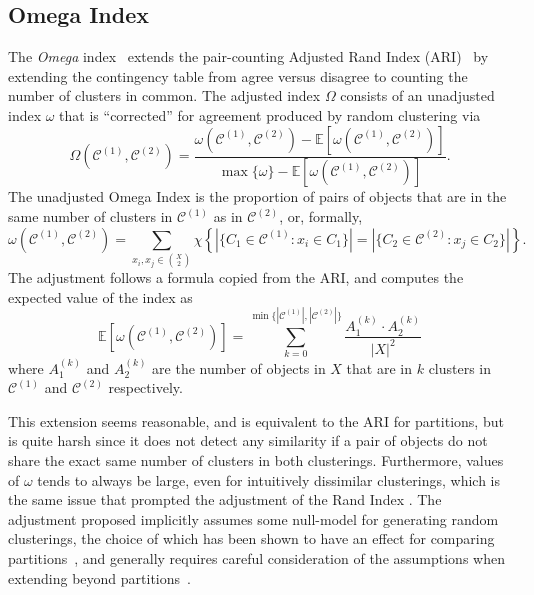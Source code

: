 \documentclass[review,los,12pt]{ryethesis}
\newcommand{\E}{{\mathbb E}}
\newcommand\cCone{\mathcal{C}^{(1)}}
\newcommand\cCtwo{\mathcal{C}^{(2)}}
\begin{document}
\subsection{Omega Index}
The \textit{Omega} index~\cite{omega} extends the pair-counting Adjusted Rand Index (ARI)~\cite{ari} by extending the contingency table from agree versus disagree to counting the number of clusters in common.
The adjusted index $\Omega$ consists of an unadjusted index $\omega$ that is ``corrected'' for agreement produced by random clustering via
\begin{equation*}
    \Omega(\cCone, \cCtwo) = \frac{\omega(\cCone, \cCtwo) - \E[\omega(\cCone, \cCtwo)]}{\max\{\omega\} - \E[\omega(\cCone, \cCtwo)]}.
\end{equation*}
The unadjusted Omega Index is the proportion of pairs of objects that are in the same number of clusters in $\cCone$ as in $\cCtwo$, or, formally,
\begin{equation}
    \omega(\cCone, \cCtwo) = \sum_{x_i, x_j \in {X \choose 2}} \chi\left\{\left|\{C_1 \in \cCone : x_i \in C_1\}\right| = \left|\{C_2 \in \cCtwo : x_j \in C_2\}\right|\right\}.
\end{equation}
The adjustment follows a formula copied from the ARI, and computes the expected value of the index as
\begin{equation}
    \E[\omega(\cCone, \cCtwo)] = \sum_{k=0}^{\min\{|\cCone|, |\cCtwo|\}} \frac{A^{(k)}_1 \cdot A^{(k)}_2}{|X|^2}
\end{equation}
where $A^{(k)}_1$ and $A^{(k)}_2$ are the number of objects in $X$ that are in $k$ clusters in $\cCone$ and $\cCtwo$ respectively.

This extension seems reasonable, and is equivalent to the ARI for partitions, but is quite harsh since it does not detect any similarity if a pair of objects do not share the exact same number of clusters in both clusterings.
Furthermore, values of $\omega$ tends to always be large, even for intuitively dissimilar clusterings, which is the same issue that prompted the adjustment of the Rand Index \cite{ari_original,ari}.
The adjustment proposed implicitly assumes some null-model for generating random clusterings, the choice of which has been shown to have an effect for comparing partitions~\cite{partition_models}, and generally requires careful consideration of the assumptions when extending beyond partitions~\cite{fuzzy_models}.
\end{document}
